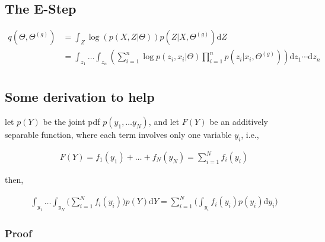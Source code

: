 \documentclass{article}
\def\d{\text{d}}
\begin{document}

\subsection{The E-Step}


\begin{equation}\begin{split}
q(\Theta, \Theta^{(g)}) &=  \int_Z \log{(p(X,Z|\Theta))} p(Z|X,\Theta^{(g)}) \d Z \\
&=  \int_{z_1} \dots \int_{z_n} \left( \sum_{i=1}^{n} \log p(z_i ,  x_i | \Theta) \prod_{i=1}^n p(z_i|x_i,\Theta^{(g)}) \right) \d z_1 \cdots \d z_n \\
\end{split}\end{equation}





\subsection{Some derivation to help}


let $p(Y)$ be the joint pdf $p(y_1,\dots y_N)$, and let $F(Y)$ be an additively separable function, where each term involves only one variable $y_i$, i.e.,

\begin{equation}\begin{split}
F(Y) = f_1(y_1) + \dots + f_N (y_N) = \sum_{i=1}^N f_i(y_i)
\end{split}\end{equation}


then,

\begin{equation}\begin{split}\label{eq integral of sum to sum of integral}
\int_{y_1} \dots \int_{y_N}  \Big(\sum_{i=1}^N f_i(y_i)\Big) p(Y) \d Y = \sum^N_{i=1} \bigg(  \int_{y_i} f_i(y_i) p(y_i) \d y_i \bigg)
\end{split}\end{equation}



\subsubsection{Proof}
\end{document}
